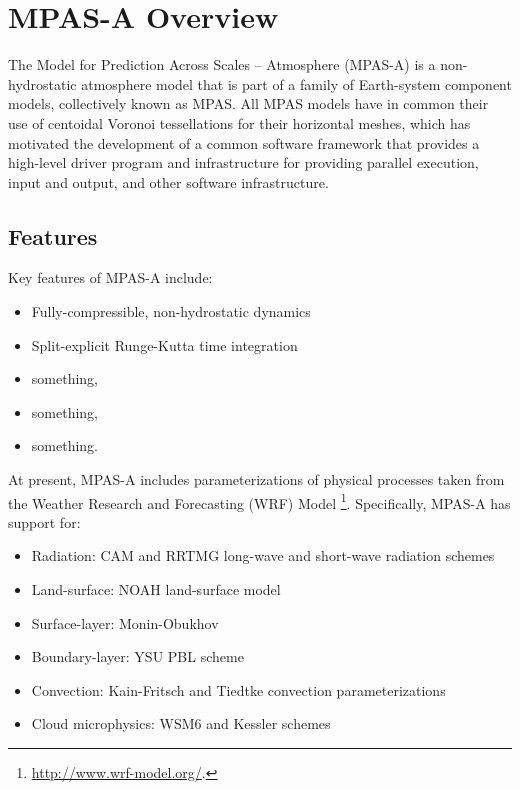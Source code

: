 
\chapter{MPAS-A Overview}
\label{chap:atmosphere_overview}

The Model for Prediction Across Scales -- Atmosphere (MPAS-A) is a
non-hydrostatic atmosphere model that is part of a family of
Earth-system component models, collectively known as MPAS.  All MPAS
models have in common their use of centoidal Voronoi tessellations for
their horizontal meshes, which has motivated the development of a common
software framework that provides a high-level driver program and
infrastructure for providing parallel execution, input and output, and
other software infrastructure.

\section{Features}

Key features of MPAS-A include:

\begin{itemize}
\item Fully-compressible, non-hydrostatic dynamics
\item Split-explicit Runge-Kutta time integration
\item something,
\item something,
\item something.
\end{itemize}

At present, MPAS-A includes parameterizations of physical processes
taken from the Weather Research and Forecasting (WRF) Model
\footnote{\url{http://www.wrf-model.org/}.}. Specifically, MPAS-A has
support for:

\begin{itemize}
\item Radiation: CAM and RRTMG long-wave and short-wave radiation schemes
\item Land-surface: NOAH land-surface model
\item Surface-layer: Monin-Obukhov
\item Boundary-layer: YSU PBL scheme
\item Convection: Kain-Fritsch and Tiedtke convection parameterizations
\item Cloud microphysics: WSM6 and Kessler schemes
\end{itemize}

